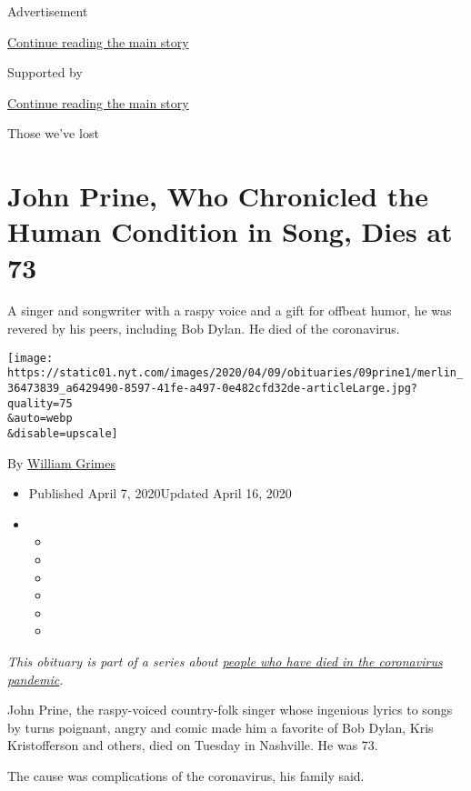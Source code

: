 Advertisement

\protect\hyperlink{after-top}{Continue reading the main story}

Supported by

\protect\hyperlink{after-sponsor}{Continue reading the main story}

Those we've lost

\hypertarget{john-prine-who-chronicled-the-human-condition-in-song-dies-at-73}{%
\section{John Prine, Who Chronicled the Human Condition in Song, Dies at
73}\label{john-prine-who-chronicled-the-human-condition-in-song-dies-at-73}}

A singer and songwriter with a raspy voice and a gift for offbeat humor,
he was revered by his peers, including Bob Dylan. He died of the
coronavirus.

\texttt{[image: https://static01.nyt.com/images/2020/04/09/obituaries/09prine1/merlin\_36473839\_a6429490-8597-41fe-a497-0e482cfd32de-articleLarge.jpg?quality=75\\\&auto=webp\\\&disable=upscale]}

By \href{https://www.nytimes.com/by/william-grimes}{William Grimes}

\begin{itemize}
\item
  Published April 7, 2020Updated April 16, 2020
\item
  \begin{itemize}
  \item
  \item
  \item
  \item
  \item
  \item
  \end{itemize}
\end{itemize}

\emph{This obituary is part of a series about}
\href{https://www.nytimes.com/series/people-who-have-died-of-the-coronavirus}{\emph{people
who have died in the coronavirus pandemic}}\emph{.}

John Prine, the raspy-voiced country-folk singer whose ingenious lyrics
to songs by turns poignant, angry and comic made him a favorite of Bob
Dylan, Kris Kristofferson and others, died on Tuesday in Nashville. He
was 73.

The cause was complications of the coronavirus, his family said.

